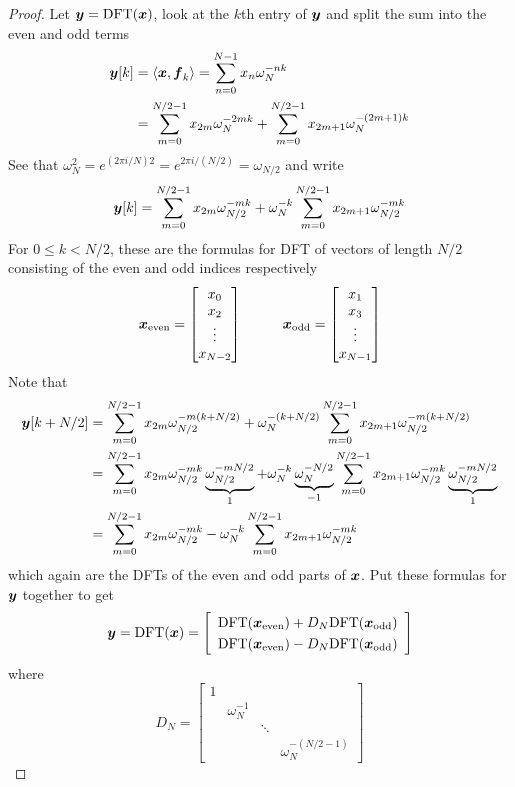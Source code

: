 \begin{theorem}
\begin{proof}
Let $\boldsymbol{y} = \mathrm{DFT}(\boldsymbol{x})$, look at the $k$th entry of $\boldsymbol{y}$ and split the sum into the even and odd terms
\begin{align*}
\boldsymbol{y}[k] &= \langle \boldsymbol{x} , \boldsymbol{f}_k \rangle = \sum_{n=0}^{N-1} x_n \omega_N^{-nk} \\
&= \sum_{m=0}^{N/2-1} x_{2m} \omega_N^{-2mk} + \sum_{m=0}^{N/2-1} x_{2m + 1} \omega_N^{-(2m + 1)k}
\end{align*}
See that $\omega_N^2 = e^{(2 \pi i / N)2} = e^{2 \pi i / (N/2)} = \omega_{N/2}$ and write
$$
\boldsymbol{y}[k]= \sum_{m=0}^{N/2-1} x_{2m} \omega_{N/2}^{-mk} + \omega_N^{-k} \sum_{m=0}^{N/2-1} x_{2m + 1} \omega_{N/2}^{-mk}
$$
For $0 \leq k < N/2$, these are the formulas for DFT of vectors of length $N/2$ consisting of the even and odd indices respectively
$$
\bs{x}_{\text{even}} = \begin{bmatrix} x_0 \\ x_2 \\ \vdots \\ x_{N-2} \end{bmatrix}
\hspace{10mm}
\bs{x}_{\text{odd}} = \begin{bmatrix} x_1 \\ x_3 \\ \vdots \\ x_{N-1} \end{bmatrix}
$$
Note that
\begin{align*}
\boldsymbol{y}[k + N/2] &= \sum_{m=0}^{N/2-1} x_{2m} \omega_{N/2}^{-m(k + N/2)} + \omega_N^{-(k+N/2)} \sum_{m=0}^{N/2-1} x_{2m + 1} \omega_{N/2}^{-m(k + N/2)} \\
&= \sum_{m=0}^{N/2-1} x_{2m} \omega_{N/2}^{-mk} \underbrace{\omega_{N/2}^{-mN/2}}_{1} + \omega_N^{-k} \underbrace{\omega_N^{-N/2}}_{-1} \sum_{m=0}^{N/2-1} x_{2m + 1} \omega_{N/2}^{-mk} \underbrace{\omega_{N/2}^{-mN/2}}_{1} \\
&= \sum_{m=0}^{N/2-1} x_{2m} \omega_{N/2}^{-mk} - \omega_N^{-k} \sum_{m=0}^{N/2-1} x_{2m + 1} \omega_{N/2}^{-mk}
\end{align*}
which again are the DFTs of the even and odd parts of $\boldsymbol{x}$. Put these formulas for $\boldsymbol{y}$ together to get
$$
\bs{y} = \mathrm{DFT}(\bs{x}) =
\renewcommand{\arraystretch}{1.25}
\left[ \begin{array}{c}
\mathrm{DFT}(\bs{x}_{\text{even}}) + D_N \mathrm{DFT}(\bs{x}_{\text{odd}}) \\
\mathrm{DFT}(\bs{x}_{\text{even}}) - D_N \mathrm{DFT}(\bs{x}_{\text{odd}})
\end{array} \right]
\renewcommand{\arraystretch}{1}
$$
where
$$
D_N = \begin{bmatrix} 1 & & & \\ & \omega_N^{-1} & & \\ & & \ddots & \\ & & & \omega_N^{-(N/2-1)} \end{bmatrix}
$$
\end{proof}
\end{theorem}

